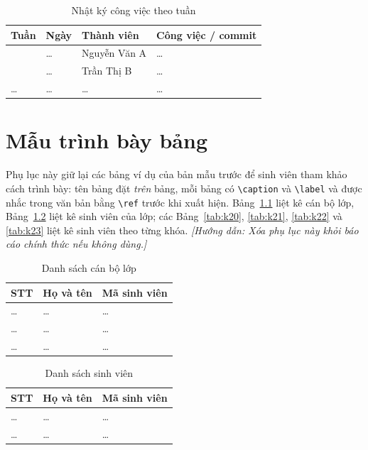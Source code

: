 \documentclass[12pt,a4paper,oneside]{report}
\newcommand{\svAten}{Nguyễn Văn A}
\newcommand{\svBten}{Trần Thị B}
\newcommand{\huongdan}[1]{{\color{guide}\itshape [Hướng dẫn: #1]}}
\begin{document}
\begin{table}[H]
  \centering
  \caption{Nhật ký công việc theo tuần}
  \label{tab:nhatky}
  \begin{tabularx}{\textwidth}{>{\centering\arraybackslash}p{1.4cm} >{\centering\arraybackslash}p{2.4cm} p{3.2cm} X}
    \toprule
    \textbf{Tuần} & \textbf{Ngày} & \textbf{Thành viên} & \textbf{Công việc / commit} \\
    \midrule
    1 & \dots & \svAten & \dots \\
    1 & \dots & \svBten & \dots \\
    \dots & \dots & \dots & \dots \\
    \bottomrule
  \end{tabularx}
\end{table}

\chapter{Mẫu trình bày bảng}
\label{pl:bang}

Phụ lục này giữ lại các bảng ví dụ của bản mẫu trước để sinh viên tham khảo
cách trình bày: tên bảng đặt \emph{trên} bảng, mỗi bảng có \texttt{\textbackslash caption}
và \texttt{\textbackslash label} và được nhắc trong văn bản bằng
\texttt{\textbackslash ref} trước khi xuất hiện. Bảng~\ref{tab:can-bo-lop}
liệt kê cán bộ lớp, Bảng~\ref{tab:sinh-vien} liệt kê sinh viên của lớp; các
Bảng~\ref{tab:k20}, \ref{tab:k21}, \ref{tab:k22} và \ref{tab:k23} liệt kê
sinh viên theo từng khóa.
\huongdan{Xóa phụ lục này khỏi báo cáo chính thức nếu không dùng.}

\begin{table}[H]
  \centering
  \caption{Danh sách cán bộ lớp}
  \label{tab:can-bo-lop}
  \begin{tabularx}{\textwidth}{>{\centering\arraybackslash}p{1.4cm} X >{\centering\arraybackslash}p{4cm}}
    \toprule
    \textbf{STT} & \textbf{Họ và tên} & \textbf{Mã sinh viên} \\
    \midrule
    \dots & \dots & \dots \\
    \dots & \dots & \dots \\
    \dots & \dots & \dots \\
    \bottomrule
  \end{tabularx}
\end{table}

\begin{table}[H]
  \centering
  \caption{Danh sách sinh viên}
  \label{tab:sinh-vien}
  \begin{tabularx}{\textwidth}{>{\centering\arraybackslash}p{1.4cm} X >{\centering\arraybackslash}p{4cm}}
    \toprule
    \textbf{STT} & \textbf{Họ và tên} & \textbf{Mã sinh viên} \\
    \midrule
    \dots & \dots & \dots \\
    \dots & \dots & \dots \\
    \bottomrule
  \end{tabularx}
\end{table}
\end{document}
